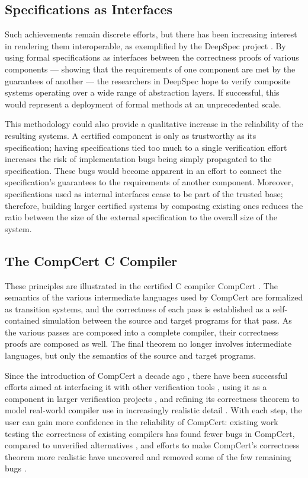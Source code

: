 \documentclass[sigplan,10pt,review,anonymous]{acmart}
\begin{document}
\subsection{Specifications as Interfaces} %

Such achievements remain discrete efforts, but
there has been increasing interest in rendering them interoperable,
as exemplified by the DeepSpec project \cite{deepspec}.
By using formal specifications as interfaces
between the correctness proofs of various components ---
showing that the requirements of one component
are met by the guarantees of another ---
the researchers in DeepSpec hope to
verify composite systems
operating over a wide range of abstraction layers.
If successful,
this would represent a deployment of formal methods
at an unprecedented scale.

This methodology could also provide a qualitative increase
in the reliability of the resulting systems.
A certified component is only as trustworthy as its specification;
having specifications tied too much to a single verification effort
increases the risk of
implementation bugs being simply propagated to
the specification.
These bugs would become apparent in an effort to
connect the specification's guarantees to
the requirements of another component.
Moreover,
specifications used as internal interfaces
cease to be part of
the trusted base;
therefore,
building larger certified systems
by composing existing ones
reduces the
ratio between the size of the external specification to
the overall size of the system.


\subsection{The CompCert C Compiler} %

These principles are illustrated in
the certified C compiler CompCert \cite{compcert}.
The semantics of the various intermediate languages
used by CompCert are formalized as transition systems,
and the correctness of each pass is established
as a self-contained simulation between
the source and target programs for that pass.
As the various passes are composed into a complete compiler,
their correctness proofs are composed as well.
The final theorem no longer involves
intermediate languages,
but only the semantics of the source and target programs.

Since the introduction of CompCert a decade ago \cite{compcert},
there have been successful efforts aimed at
interfacing it with other verification tools \cite{vst},
using it as a component in larger verification projects \cite{popl15},
and refining its correctness theorem
to model real-world compiler use
in increasingly realistic detail
\cite{qompcert,sepcompcert,compcompcert,compcerttso,compcertshm}.
With each step,
the user can gain more confidence in the reliability of CompCert:
existing work testing the correctness of existing compilers
has found fewer bugs in CompCert,
compared to unverified alternatives \cite{csmith},
and efforts to make CompCert's correctness theorem more realistic
have uncovered and removed some of the few remaining bugs \cite{sepcompcert}.
\end{document}
